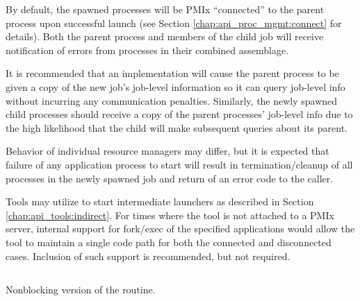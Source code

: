 By default, the spawned processes will be PMIx ``connected'' to the parent process upon successful launch (see Section \ref{chap:api_proc_mgmt:connect}
for details).  
Both the parent process and members of the child job will receive notification of errors from processes in their combined assemblage.

\advicermstart
It is recommended that an implementation will cause the parent process to be given a copy of the new job's job-level
information so it can query job-level info without incurring any communication penalties.  Similarly, the newly 
spawned child processes should receive a copy of the parent processes' job-level info due to the high likelihood 
that the child will make subsequent queries about its parent.
\advicermend

\adviceuserstart
Behavior of individual resource managers may differ, but it is expected that failure of any application process to start will result in termination/cleanup of all processes in the newly spawned job and return of an error code to the caller.
\adviceuserend

\adviceimplstart
Tools may utilize  to start intermediate launchers as described in Section \ref{chap:api_tools:indirect}. For times where the tool is not attached to a \ac{PMIx} server, internal support for fork/exec of the specified applications would allow the tool to maintain a single code path for both the connected and disconnected cases. Inclusion of such support is recommended, but not required.
\adviceimplend


\subsection{}

\summary

Nonblocking version of the  routine.

\format



